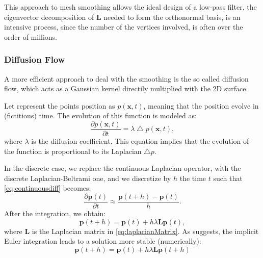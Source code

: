 This approach to mesh smoothing allows the ideal design of a low-pass filter, the eigenvector decomposition of $\mathbf{L}$ needed to form the orthonormal basis, is an intensive process, since the number of the vertices involved, is often over the order of millions.
\subsubsection{Diffusion Flow}
A more efficient approach to deal with the smoothing is the so called diffusion flow, which acts as a Gaussian kernel directily multiplied with the 2D surface.

Let represent the points position as $p(\mathbf{x},t)$, meaning that the position evolve in (fictitious) time.
The evolution of this function is modeled as:
\begin{equation}
\label{eq:continuousdiff}
\frac{\partial p(\mathbf{x},t)}{\partial t} = \lambda \bigtriangleup p(\mathbf{x}, t),
\end{equation}
where $\lambda$ is the diffusion coefficient.
This equation implies that the evolution of the function is proportional to its Laplacian $\bigtriangleup p$.

In the discrete case, we replace the continuous Laplacian operator, with the discrete Laplacian-Beltrami one, and we discretize by $h$ the time $t$ such that \eqref{eq:continuousdiff} becomes:
\begin{equation}
\frac{\partial \mathbf{p}(t)}{\partial t} \approx \frac{\mathbf{p}(t+h) - \mathbf{p}(t)}{h}.
\end{equation}
After the integration, we obtain:
\begin{equation}
\mathbf{p}(t+h) = \mathbf{p}(t) + h \lambda \mathbf{L}\mathbf{p}(t),
\end{equation}
where $\mathbf{L}$ is the Laplacian matrix in \eqref{eq:laplacianMatrix}.
As \cite{desbrun1999implicit} suggests, the implicit Euler integration leads to a solution more stable (numerically):
\begin{equation}
\mathbf{p}(t+h) = \mathbf{p}(t) + h \lambda \mathbf{L}\mathbf{p}(t+h)
\end{equation}

